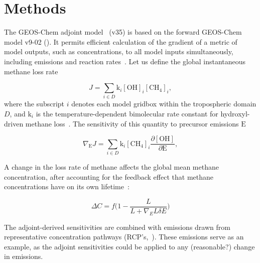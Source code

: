 \section{Methods}

The GEOS-Chem adjoint model~\cite{ref:henze2007} (v35) is based on the forward GEOS-Chem model v9-02 (\href{http://www.geos-chem.org}{}). It permits efficient calculation of the gradient of a metric of model outputs, such as concentrations, to all model inputs simultaneously, including emissions and reaction rates~\cite{ref:walker2015}. Let us define the global instantaneous methane loss rate

\begin{equation}
J=\sum_{i \in D} \mathrm{k}_i \mathrm{[OH]}_i \mathrm{[CH_4]}_i,
\end{equation}
where the subscript $i$ denotes each model gridbox within the tropospheric domain $D$, and $\mathrm{k}_i$ is the temperature-dependent bimolecular rate constant for hydroxyl-driven methane loss~\citep{ref:sander2011}. The sensitivity of this quantity to precursor emissions $\mathrm{E}$

\begin{equation}
\nabla_\mathrm{E} J = \sum_{i \in D} \mathrm{k}_i \mathrm{[CH_4]}_i \frac{\partial \mathrm{[OH]}}{\partial \mathrm{E}},
\end{equation}

A change in the loss rate of methane affects the global mean methane concentration, after accounting for the feedback effect that methane concentrations have on its own lifetime~\citep{ref:naik2005}:

\begin{equation}
\Delta C = f\big(1 - \frac{L}{L+\nabla_E L \delta E}\big)
\end{equation}

The adjoint-derived sensitivities are combined with emissions drawn from representative concentration pathways (RCP's,~\citet{ref:vanvuuren2011}). These emissions serve as an example, as the adjoint sensitivities could be applied to any (reasonable?) change in emissions.